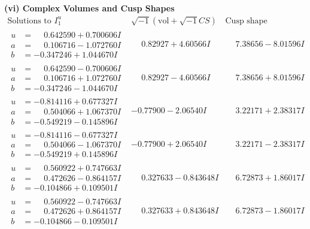 \documentclass[1p]{elsarticle_modified}
\theoremstyle{definition}
\newcommand{\I}{\sqrt{-1}}
\begin{document}
\newpage\flushleft \textbf{(vi) Complex Volumes and Cusp Shapes}
$$\begin{array}{c|c|c}  
\text{Solutions to }I^u_{1}& \I (\text{vol} + \sqrt{-1}CS) & \text{Cusp shape}\\
 \hline 
\begin{aligned}
u &= \phantom{-}0.642590 + 0.700606 I \\
a &= \phantom{-}0.106716 - 1.072760 I \\
b &= -0.347246 + 1.044670 I\end{aligned}
 & \phantom{-}0.82927 + 4.60566 I & \phantom{-}7.38656 - 8.01596 I \\ \hline\begin{aligned}
u &= \phantom{-}0.642590 - 0.700606 I \\
a &= \phantom{-}0.106716 + 1.072760 I \\
b &= -0.347246 - 1.044670 I\end{aligned}
 & \phantom{-}0.82927 - 4.60566 I & \phantom{-}7.38656 + 8.01596 I \\ \hline\begin{aligned}
u &= -0.814116 + 0.677327 I \\
a &= \phantom{-}0.504066 + 1.067370 I \\
b &= -0.549219 - 0.145896 I\end{aligned}
 & -0.77900 - 2.06540 I & \phantom{-}3.22171 + 2.38317 I \\ \hline\begin{aligned}
u &= -0.814116 - 0.677327 I \\
a &= \phantom{-}0.504066 - 1.067370 I \\
b &= -0.549219 + 0.145896 I\end{aligned}
 & -0.77900 + 2.06540 I & \phantom{-}3.22171 - 2.38317 I \\ \hline\begin{aligned}
u &= \phantom{-}0.560922 + 0.747663 I \\
a &= \phantom{-}0.472626 - 0.864157 I \\
b &= -0.104866 + 0.109501 I\end{aligned}
 & \phantom{-}0.327633 - 0.843648 I & \phantom{-}6.72873 + 1.86017 I \\ \hline\begin{aligned}
u &= \phantom{-}0.560922 - 0.747663 I \\
a &= \phantom{-}0.472626 + 0.864157 I \\
b &= -0.104866 - 0.109501 I\end{aligned}
 & \phantom{-}0.327633 + 0.843648 I & \phantom{-}6.72873 - 1.86017 I \\ \hline\begin{aligned}

\end{aligned}
\end{array}$$
\end{document}

